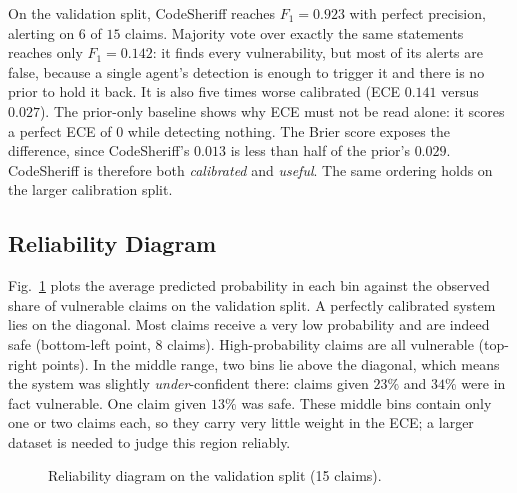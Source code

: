 \documentclass[conference]{IEEEtran}
\begin{document}
On the validation split, CodeSheriff reaches $F_1=0.923$ with perfect
precision, alerting on $6$ of $15$ claims. Majority vote over exactly the
same statements reaches only $F_1=0.142$: it finds every vulnerability, but
most of its alerts are false, because a single agent's detection is enough
to trigger it and there is no prior to hold it back. It is also five times
worse calibrated (ECE $0.141$ versus $0.027$). The prior-only baseline
shows why ECE must not be read alone: it scores a perfect ECE of $0$ while
detecting nothing. The Brier score exposes the difference, since
CodeSheriff's $0.013$ is less than half of the prior's $0.029$. CodeSheriff
is therefore both \emph{calibrated} and \emph{useful}. The same ordering
holds on the larger calibration split.

\subsection{Reliability Diagram}
Fig.~\ref{fig:reliability} plots the average predicted probability in each
bin against the observed share of vulnerable claims on the validation
split. A perfectly calibrated system lies on the diagonal. Most claims
receive a very low probability and are indeed safe (bottom-left point,
$8$ claims). High-probability claims are all vulnerable (top-right points).
In the middle range, two bins lie above the diagonal, which means the
system was slightly \emph{under}-confident there: claims given $23\%$ and
$34\%$ were in fact vulnerable. One claim given $13\%$ was safe. These
middle bins contain only one or two claims each, so they carry very little
weight in the ECE; a larger dataset is needed to judge this region
reliably.

\begin{figure}[t]
\centering
{}
\caption{Reliability diagram on the validation split (15 claims).}
\label{fig:reliability}
\end{figure}
\end{document}
